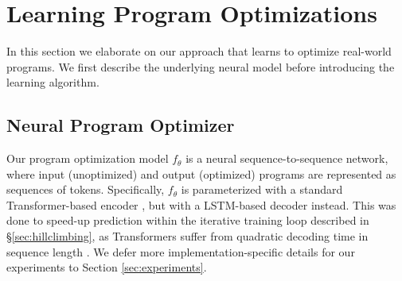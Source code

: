 \documentclass{article}
\begin{document}
\section{Learning Program Optimizations}
\label{sec:learning}


In this section we elaborate on our approach that learns to optimize real-world programs. 
We first describe the underlying neural model before introducing the learning algorithm.


\subsection{Neural Program Optimizer}


Our program optimization model $f_{\theta}$ is a neural sequence-to-sequence network, where input (unoptimized) and output (optimized) programs are represented as sequences of tokens.
Specifically, $f_{\theta}$ is parameterized with a standard Transformer-based encoder \citep{vaswani2017attention}, but with a LSTM-based decoder \citep{hochreiter1997long,chen-etal-2018-best} instead.
This was done to speed-up prediction within the iterative training loop described in \S\ref{sec:hillclimbing}, as Transformers suffer from quadratic decoding time in sequence length \citep{zhang-etal-2018-accelerating}. We defer more implementation-specific details for our experiments to Section \ref{sec:experiments}. 
\end{document}
